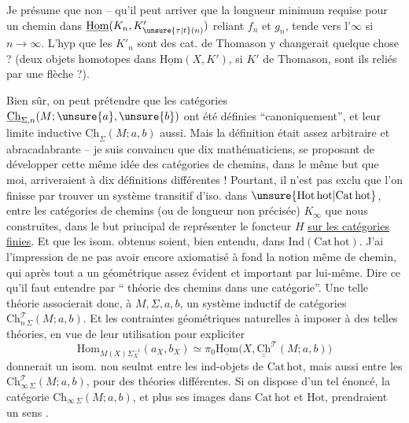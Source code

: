 Je présume que non -- qu'il peut arriver que
la longueur minimum requise  pour un 
chemin dans $\underline{\mathrm{Hom}}(K_n,K'_{\unsure{\tau|t}(n)})$ reliant $f_n$ et $g_n$,
tende vers l'$\infty$ si $n\to\infty$. L'hyp que les
$K'_n$ sont des cat. de Thomason y changerait
quelque chose ? (deux objets homotopes dans
$\underline{\mathrm{Hom}}(X,K')$, si $K'$ de Thomason, sont ils reliés
par une flèche ?).

Bien sûr, on peut prétendre que les catégories
$\underline{\mathrm{Ch}}_{\Sigma,n}(M;\unsure{a},\unsure{b})$ ont été définies ``canoniquement'', et
leur limite inductive $\underline{\mathrm{Ch}}_\Sigma(M;a,b)$ aussi.
Mais la définition était assez arbitraire et abracadabrante -- je suis convaincu que dix mathématiciens,
se proposant de développer cette même
idée des catégories de chemins, dans le même
but que moi, arriveraient à dix définitions
différentes ! Pourtant, il n'est pas exclu que
l'on finisse par trouver un système transitif
d'iso. dans $\unsure{\mathrm{Hot}\,\mathrm{hot}|\mathrm{Cat}\,\mathrm{hot}}$, entre les catégories
de chemins   (ou de longueur non précisée)
$K_\infty$  que nous  construites, dans le but
principal  de représenter le foncteur $H$ \uline{sur les
catégories finies}. Et que les isom. obtenus
soient, bien entendu,  dans $\mathrm{Ind}(\mathrm{Cat}\,\mathrm{hot})$.
J'ai l'impression de ne pas avoir encore
axiomatisé à fond la notion même de
chemin, qui après tout a un  
géométrique assez évident et important par
lui-même. Dire  ce qu'il faut entendre
par `` théorie des chemins dans une catégorie''.
Une telle théorie  associerait donc, à
$M,\Sigma,a,b$, un  système inductif de
catégories $\mathrm{Ch}_{n\,\Sigma}^{\mathcal T}(M;a,b)$. Et les contraintes
géométriques naturelles à imposer à  des
telles théories, en vue  de leur utilisation
pour expliciter
\[
\mathrm{Hom}_{M(X)\Sigma_X^{-1}}(a_X,b_X)\simeq
\pi_0\underline{\mathrm{Hom}}\bigl(X,\underline{\underline{\mathrm{Ch}}}^{\mathcal T}(M;a,b)\bigr)
\]
donnerait un isom.  non seulmt
entre les ind-objets de $\mathrm{Cat}\,\mathrm{hot}$, mais  aussi
entre les $\mathrm{Ch}_{\infty\,\Sigma}^{\mathcal T}(M;a,b)$, pour des
théories différentes. Si on dispose d'un
tel énoncé, la catégorie $\mathrm{Ch}_{\infty\,\Sigma}(M;a,b)$,
et plus  ses images dans $\mathrm{Cat}\,\mathrm{hot}$ et $\mathrm{Hot}$,
prendraient un sens .

